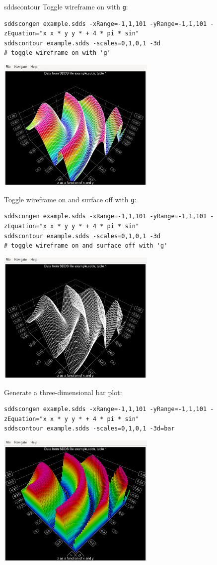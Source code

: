 \begin{sddsprog}{sddscontour}
    Toggle wireframe on with \verb|g|:
    \begin{verbatim}
sddscongen example.sdds -xRange=-1,1,101 -yRange=-1,1,101 -zEquation="x x * y y * + 4 * pi * sin"
sddscontour example.sdds -scales=0,1,0,1 -3d
# toggle wireframe on with 'g'
    \end{verbatim}
    \centerline{\includegraphics[width=3in]{3D-surface-plot2.eps}}

    Toggle wireframe on and surface off with \verb|g|:
    \begin{verbatim}
sddscongen example.sdds -xRange=-1,1,101 -yRange=-1,1,101 -zEquation="x x * y y * + 4 * pi * sin"
sddscontour example.sdds -scales=0,1,0,1 -3d
# toggle wireframe on and surface off with 'g'
    \end{verbatim}
    \centerline{\includegraphics[width=3in]{3D-surface-plot3.eps}}

    Generate a three-dimensional bar plot:
    \begin{verbatim}
sddscongen example.sdds -xRange=-1,1,101 -yRange=-1,1,101 -zEquation="x x * y y * + 4 * pi * sin"
sddscontour example.sdds -scales=0,1,0,1 -3d=bar
    \end{verbatim}
    \centerline{\includegraphics[width=3in]{3D-bar-plot.eps}}


\end{sddsprog}
